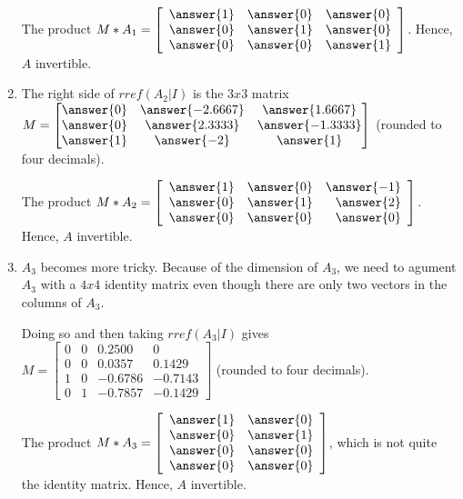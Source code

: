 \documentclass{ximera}
\begin{document}
\begin{exploration}
\begin{enumerate}
    The product $M*A_1=   \startmat{rrr}
    \answer{1} & \answer{0} & \answer{0} \\ 
    \answer{0} & \answer{1} & \answer{0} \\ 
    \answer{0} & \answer{0} & \answer{1} 
  \stopmat$. Hence, $A$   invertible.
    \item The right side of $rref(A_2|I)$ is the $3x3$ matrix $M = \begin{bmatrix} 
      \answer{0} & \answer{-2.6667} & \answer{1.6667} \\ 
      \answer{0} & \answer{2.3333} & \answer{-1.3333} \\ 
      \answer{1} & \answer{-2} & \answer{1} 
      \end{bmatrix}$ (rounded to four decimals).
      
    The product $M*A_2=   \startmat{rrr}
    \answer{1} & \answer{0} & \answer{-1} \\ 
    \answer{0} & \answer{1} & \answer{2} \\ 
    \answer{0} & \answer{0} & \answer{0} 
  \stopmat$. Hence, $A$   invertible.
    \item $A_3$ becomes more tricky. Because of the dimension of $A_3$, we need to agument $A_3$ with a $4x4$ identity matrix even though there are only two vectors in the columns of $A_3$. 
    
    Doing so and then taking $rref(A_3|I)$ gives $M = \begin{bmatrix} 
      0 & 0 & 0.2500 & 0 \\ 
      0 & 0 & 0.0357 & 0.1429 \\ 
      1 & 0 & -0.6786 & -0.7143 \\ 
      0 & 1 & -0.7857 & -0.1429 
      \end{bmatrix}$ (rounded to four decimals).
      
    The product $M*A_3=   \startmat{rrr}
    \answer{1} & \answer{0}  \\ 
    \answer{0} & \answer{1}  \\ 
    \answer{0} & \answer{0} \\
    \answer{0} & \answer{0}
  \stopmat$, which is not quite the identity matrix. Hence, $A$   invertible.
  \end{enumerate}

\end{exploration}
\end{document}

